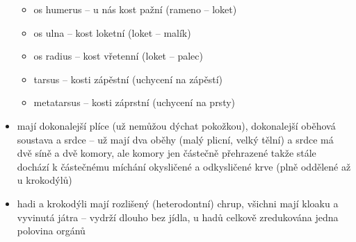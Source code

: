 \documentclass{article}
\begin{document}
\begin{itemize}
  \begin{itemize}
    \item os humerus -- u nás kost pažní (rameno -- loket)
    \item os ulna -- kost loketní (loket -- malík)
    \item os radius -- kost vřetenní (loket -- palec)
    \item tarsus -- kosti zápěstní (uchycení na zápěstí)
    \item metatarsus -- kosti záprstní (uchycení na prsty)
  \end{itemize}
  \item mají dokonalejší plíce (už nemůžou dýchat pokožkou), dokonalejší oběhová soustava a srdce -- už mají dva oběhy (malý plicní, velký tělní) a srdce má dvě síně a dvě komory, ale komory jen částečně přehrazené takže stále dochází k částečnému míchání okysličené a odkysličené krve (plně oddělené až u krokodýlů)
  \item hadi a krokodýli mají rozlišený (heterodontní) chrup, všichni mají kloaku a vyvinutá játra -- vydrží dlouho bez jídla, u hadů celkově zredukována jedna polovina orgánů
\end{itemize}
\end{document}
